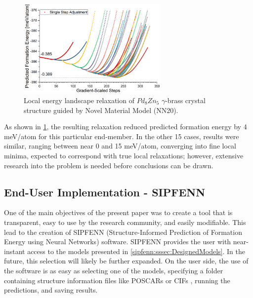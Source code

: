 \begin{figure}[H]
    \centering
    \includegraphics[width=0.65\textwidth]{sipfenn/localRelaxation_6.png}
    \caption{Local energy landscape relaxation of $Pd_8Zn_5$ $\gamma$-brass crystal structure guided by Novel Material Model (NN20).}
    \label{sipfenn:fig:localrelaxationpdzn}
\end{figure}

As shown in \ref{sipfenn:fig:localrelaxationpdzn}, the resulting relaxation reduced predicted formation energy by 4 meV/atom for this particular end-member. In the other 15 cases, results were similar, ranging between near 0 and 15 meV/atom, converging into fine local minima, expected to correspond with true local relaxations; however, extensive research into the problem is needed before conclusions can be drawn.


\subsection{End-User Implementation - SIPFENN} \label{sipfenn:ssec:SIPFENN}

One of the main objectives of the present paper was to create a tool that is transparent, easy to use by the research community, and easily modifiable. This lead to the creation of SIPFENN (Structure-Informed Prediction of Formation Energy using Neural Networks) software. SIPFENN provides the user with near-instant access to the models presented in \ref{sipfenn:sssec:DesignedModels}. In the future, this selection will likely be further expanded. On the user side, the use of the software is as easy as selecting one of the models, specifying a folder containing structure information files like POSCARs \cite{POSCARFile} or CIFs \cite{Hall1991TheCrystallography}, running the predictions, and saving results.

